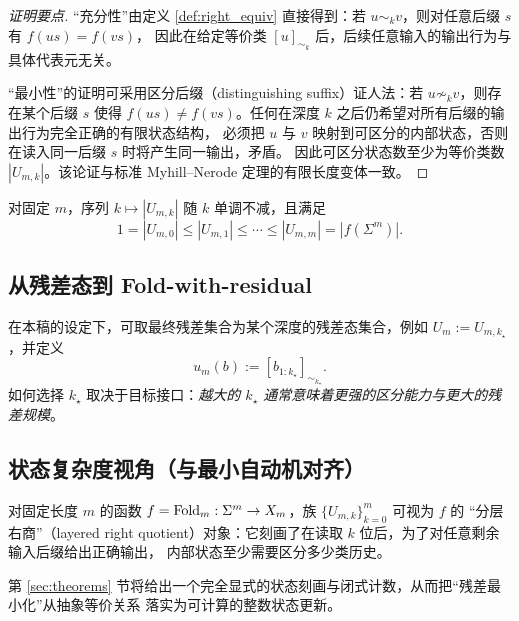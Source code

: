 \begin{proof}[证明要点]
“充分性”由定义 \ref{def:right_equiv} 直接得到：若 $u\sim_k v$，则对任意后缀 $s$ 有 $f(us)=f(vs)$，
因此在给定等价类 $[u]_{\sim_k}$ 后，后续任意输入的输出行为与具体代表元无关。

“最小性”的证明可采用区分后缀（distinguishing suffix）证人法：若 $u\not\sim_k v$，则存在某个后缀
$s$ 使得 $f(us)\ne f(vs)$。任何在深度 $k$ 之后仍希望对所有后缀的输出行为完全正确的有限状态结构，
必须把 $u$ 与 $v$ 映射到可区分的内部状态，否则在读入同一后缀 $s$ 时将产生同一输出，矛盾。
因此可区分状态数至少为等价类数 $|U_{m,k}|$。该论证与标准 Myhill--Nerode 定理的有限长度变体一致。
\end{proof}

\begin{proposition}[单调性]\label{prop:residual_monotone}
对固定 $m$，序列 $k\mapsto |U_{m,k}|$ 随 $k$ 单调不减，且满足
\[
1=|U_{m,0}|\le |U_{m,1}|\le\cdots\le |U_{m,m}|=|f(\Sigma^m)|.
\]
\end{proposition}

\subsection{从残差态到 Fold-with-residual}
在本稿的设定下，可取最终残差集合为某个深度的残差态集合，例如 $U_m:=U_{m,k_\star}$，并定义
\[
u_m(b):=[b_{1:k_\star}]_{\sim_{k_\star}}.
\]
如何选择 $k_\star$ 取决于目标接口：\emph{越大的 $k_\star$ 通常意味着更强的区分能力与更大的残差规模}。

\subsection{状态复杂度视角（与最小自动机对齐）}
对固定长度 $m$ 的函数 $f=\mathrm{Fold}_m:\Sigma^m\to X_m$，族 $\{U_{m,k}\}_{k=0}^{m}$ 可视为 $f$ 的
“分层右商”（layered right quotient）对象：它刻画了在读取 $k$ 位后，为了对任意剩余输入后缀给出正确输出，
内部状态至少需要区分多少类历史。\cite{Myhill1957FiniteAutomata,Nerode1958Automata,Sipser2012TOC}

第 \ref{sec:theorems} 节将给出一个完全显式的状态刻画与闭式计数，从而把“残差最小化”从抽象等价关系
落实为可计算的整数状态更新。

